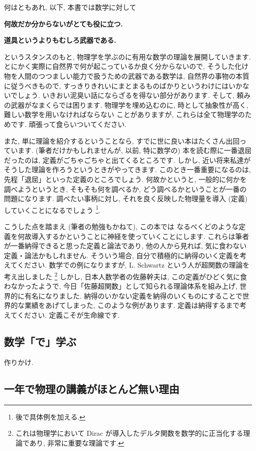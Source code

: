 \documentclass[openany, a4paper, oneside]{jsbook}
\theoremstyle{break}
\theoremstyle{breakdefn}
\begin{document}
何はともあれ, 以下, 本書では数学に対して
\begin{center}
\textbf{何故だか分からないがとても役に立つ.}

\textbf{道具というよりもむしろ武器である.}
\end{center}
というスタンスのもと, 物理学を学ぶのに有用な数学の理論を展開していきます.
とにかく実際に自然界で何が起こっているか良く分からないので,
そうした化け物を人間のつつましい能力で扱うための武器である数学は,
自然界の事物の本質に従うべきもので,
すっきりきれいにまとまるものばかりというわけにはいかないでしょう.
いきおい泥臭い話にならざるを得ない部分があります.
そして, 頼みの武器がなまくらでは困ります.
物理学を埋め込むのに, 時として抽象性が高く, 難しい数学を用いなければならない
ことがありますが, これらは全て物理学のためです.
頑張って食らいついてください.

また, 単に理論を紹介するということなら, すでに世に良い本はたくさん出回っています.
(筆者だけかもしれませんが, 以前, 特に数学の) 本を読む際に一番退屈だったのは,
定義がごちゃごちゃと出てくるところです.
しかし, 近い将来私達がそうした理論を作ろうというときがやってきます.
このとき一番重要になるのは, 先程「退屈」といった定義のところでしょう.
何故かというと, 一般的に何かを調べようというとき,
そもそも何を調べるか, どう調べるかということが一番の問題になります.
調べたい事柄に対し, それを良く反映した物理量を導入 (定義) していくことになるでしょう \footnote{後で具体例を加える.
 }.

こうした点を踏まえ (筆者の勉強もかねて), この本では
なるべくどのような定義を何故導入するかということに神経を使っていくことにします.
これらは筆者が一番納得できると思った定義と論法であり, 他の人から見れば,
気に食わない定義・論法かもしれません.
そういう場合, 自分で積極的に納得のいく定義を考えてください.
数学での例になりますが, L. Schwartz という人が超関数の理論を考え出しました \footnote{これは物理学において Dirac が導入したデルタ関数を数学的に正当化する理論であり,
非常に重要な理論です.
 }
しかし, 日本人数学者の佐藤幹夫は, この定義がひどく気に食わなかったようで,
今日「佐藤超関数」として知られる理論体系を組み上げ, 世界的に有名になりました.
納得のいかない定義を納得のいくものにすることで世界的な業績をあげてしまった, このような例があります.
定義は納得するまで考えてください.
定義こそが生命線です.
\subsection{数学「で」学ぶ}


作りかけ.
\subsection{一年で物理の講義がほとんど無い理由}
\end{document}
